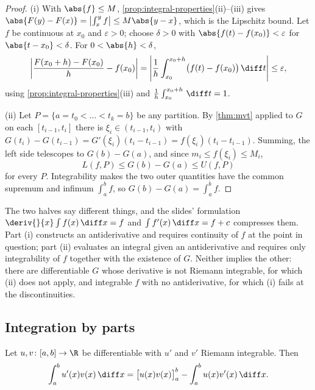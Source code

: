 \begin{proof}
	(i) With $\abs{f}\leq M$, \autoref{prop:integral-properties}(ii)--(iii) gives
	$\abs{F(y)-F(x)}=\bigl|\int_x^yf\bigr|\leq M\abs{y-x}$, which is the Lipschitz
	bound. Let $f$ be continuous at $x_0$ and $\varepsilon>0$; choose $\delta>0$
	with $\abs{f(t)-f(x_0)}<\varepsilon$ for $\abs{t-x_0}<\delta$. For
	$0<\abs{h}<\delta$,
	\[
		\left|\frac{F(x_0+h)-F(x_0)}{h}-f(x_0)\right|
		=\left|\frac{1}{h}\int_{x_0}^{x_0+h}\bigl(f(t)-f(x_0)\bigr)\,\diff t\right|
		\leq\varepsilon,
	\]
	using \autoref{prop:integral-properties}(iii) and
	$\frac1h\int_{x_0}^{x_0+h}\,\diff t=1$.

	(ii) Let $P=\{a=t_0<\dots<t_k=b\}$ be any partition. By
	\autoref{thm:mvt} applied to $G$ on each $[t_{i-1},t_i]$ there is
	$\xi_i\in(t_{i-1},t_i)$ with
	$G(t_i)-G(t_{i-1})=G'(\xi_i)(t_i-t_{i-1})=f(\xi_i)(t_i-t_{i-1})$. Summing, the
	left side telescopes to $G(b)-G(a)$, and since $m_i\leq f(\xi_i)\leq M_i$,
	\[
		L(f,P)\leq G(b)-G(a)\leq U(f,P)
	\]
	for every $P$. Integrability makes the two outer quantities have the common
	supremum and infimum $\int_a^bf$, so $G(b)-G(a)=\int_a^bf$.
\end{proof}

The two halves say different things, and the slides' formulation
$\deriv{}{x}\int f(x)\,\diff x=f$ and $\int f'(x)\,\diff x=f+c$
\autocite[slide 68]{fukuda2026calculus} compresses them. Part (i) constructs an
antiderivative and requires continuity of $f$ at the point in question; part (ii)
evaluates an integral given an antiderivative and requires only integrability of
$f$ together with the existence of $G$. Neither implies the other: there are
differentiable $G$ whose derivative is not Riemann integrable, for which (ii)
does not apply, and integrable $f$ with no antiderivative, for which (i) fails at
the discontinuities.

\subsection{Integration by parts}

\begin{theorem}\label{thm:by-parts}
	Let $u,v\colon[a,b]\to\R$ be differentiable with $u'$ and $v'$ Riemann
	integrable. Then
	\begin{equation}\label{eq:by-parts}
		\int_a^bu'(x)v(x)\,\diff x=\bigl[u(x)v(x)\bigr]_a^b-\int_a^bu(x)v'(x)\,\diff x .
	\end{equation}
\end{theorem}

